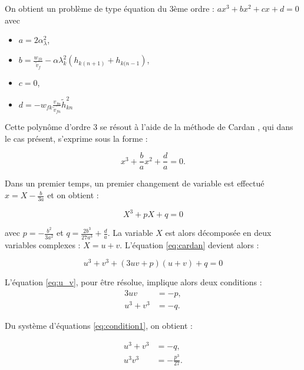 On obtient un problème de type équation du 3ème ordre : $ax^3+bx^2+cx+d = 0$ avec 
\begin{itemize}
\item $a = 2\alpha_\lambda^2$, 
\item $b = \frac{w_{fk}}{\tilde{v}_f} - \alpha \lambda_k^2\left(h_{k(n+1)}+h_{k(n-1}\right)$, 
\item $c = 0$, 
\item $d = -w_{fk}\frac{v_{fn}}{\tilde{v}_{fn}}\tilde{h}_{kn}^2$
\end{itemize}

Cette polynôme d'ordre 3 se résout à l'aide de la méthode de Cardan \cite{nickalls1993new}, qui dans le cas présent, s'exprime sous la forme : 

\begin{equation}
x^3+\frac{b}{a}x^2+\frac{d}{a} = 0.
\end{equation}

Dans un premier temps, un premier changement de variable est effectué $x = X - \frac{b}{3a}$ et on obtient : 

\begin{equation}\label{eq:cardan}
X^3+pX+q = 0
\end{equation}

avec $p = -\frac{b^2}{3a^2}$ et $q = \frac{2b^3}{27a^3}+\frac{d}{a}$. La variable $X$ est alors décomposée en deux variables complexes : $X = u+v$. L'équation \ref{eq:cardan} devient alors : 

\begin{equation}\label{eq:u_v}
u^3+v^3+(3uv+p)(u+v)+q = 0
\end{equation}

L'équation \ref{eq:u_v}, pour être résolue, implique alors deux conditions  : 
\begin{subequations}\label{eq:condition1}
\begin{align}
3uv &= -p,\\
u^3+v^3 &= -q.
\end{align}
\end{subequations}

Du système d'équations \ref{eq:condition1}, on obtient  : 

\begin{subequations}\label{eq:condition2}
\begin{align}
u^3+v^3 &= -q,\\
u^3v^3 &= -\frac{p^3}{27}.
\end{align}
\end{subequations}

